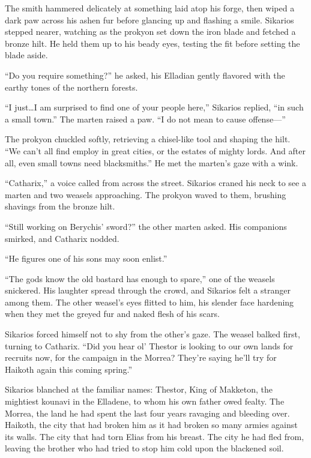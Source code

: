 The smith hammered delicately at something laid atop his forge, then wiped a dark paw across his ashen fur before glancing up and flashing a smile. Sikarios stepped nearer, watching as the prokyon set down the iron blade and fetched a bronze hilt. He held them up to his beady eyes, testing the fit before setting the blade aside.

``Do you require something?'' he asked, his Elladian gently flavored with the earthy tones of the northern forests.

``I just\ldots{}I am surprised to find one of your people here,'' Sikarios replied, ``in such a small town.'' The marten raised a paw. ``I do not mean to cause offense---''

The prokyon chuckled softly, retrieving a chisel-like tool and shaping the hilt. ``We can't all find employ in great cities, or the estates of mighty lords. And after all, even small towns need blacksmiths.'' He met the marten's gaze with a wink.

``Catharix,'' a voice called from across the street. Sikarios craned his neck to see a marten and two weasels approaching. The prokyon waved to them, brushing shavings from the bronze hilt.

``Still working on Berychis' sword?'' the other marten asked. His companions smirked, and Catharix nodded.

``He figures one of his sons may soon enlist.''

``The gods know the old bastard has enough to spare,'' one of the weasels snickered. His laughter spread through the crowd, and Sikarios felt a stranger among them. The other weasel's eyes flitted to him, his slender face hardening when they met the greyed fur and naked flesh of his scars.

Sikarios forced himself not to shy from the other's gaze. The weasel balked first, turning to Catharix. ``Did you hear ol' Thestor is looking to our own lands for recruits now, for the campaign in the Morrea? They're saying he'll try for Haikoth again this coming spring.''

Sikarios blanched at the familiar names: Thestor, King of Makketon, the mightiest kounavi in the Elladene, to whom his own father owed fealty. The Morrea, the land he had spent the last four years ravaging and bleeding over. Haikoth, the city that had broken him as it had broken so many armies against its walls. The city that had torn Elias from his breast. The city he had fled from, leaving the brother who had tried to stop him cold upon the blackened soil.


